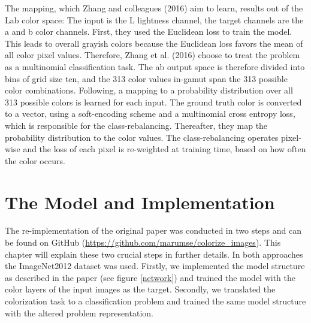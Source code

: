 \documentclass[12pt,letterpaper]{article}
\begin{document}
The mapping, which Zhang and colleagues (2016) aim to learn, results out of the  Lab color space: The input is the L lightness channel, the target channels are the a and b color channels. First, they used the Euclidean loss to train the model. This leads to overall grayish colors because the Euclidean loss favors the mean of all color pixel values. Therefore, Zhang et al. (2016) choose to treat the problem as a multinomial classification task. The ab output space is therefore divided into bins of grid size ten, and the 313 color values in-gamut span the 313 possible color combinations. Following, a mapping to a probability distribution over all 313 possible colors is learned for each input. The ground truth color is converted to a vector, using a soft-encoding scheme and a multinomial cross entropy loss, which is responsible for the class-rebalancing. Thereafter, they map the probability distribution to the color values. The class-rebalancing operates pixel-wise and the loss of each pixel is re-weighted at training time, based on how often the color occurs.

\section{The Model and Implementation}
The re-implementation of the original paper \citep{Zhang.2016} was conducted in two steps and can be found on GitHub (\url{https://github.com/marumse/colorize_images}). This chapter will explain these two crucial steps in further details. In both approaches the ImageNet2012 dataset was used. Firstly, we implemented the model structure as described in the paper (see figure \ref{network}) and trained the model with the color layers of the input images as the target. Secondly, we translated the colorization task to a classification problem and trained the same model structure with the altered problem representation.
\end{document}

